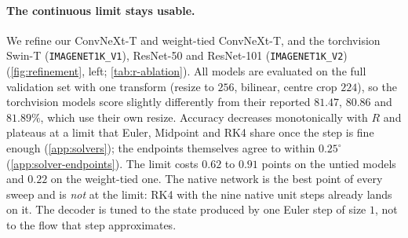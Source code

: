 \begin{table}[t]
    \centering
    \caption{Euler refinement with $\Delta t{=}1/R$ ($T$ kept), ImageNet top-1 (\%).
    For the weight-tied model $R$ means $9R$ applications of the shared block.
    ODE limit: RK4 at $R{=}128$ (tied: $1024$ steps).}
    \label{tab:r-ablation}
    \small
    \setlength{\tabcolsep}{2.8pt}
\end{table}

\paragraph{The continuous limit stays usable.}
We refine our ConvNeXt-T and weight-tied ConvNeXt-T, and the torchvision Swin-T
(\texttt{IMAGENET1K\_V1}), ResNet-50 and ResNet-101 (\texttt{IMAGENET1K\_V2})
(\cref{fig:refinement}, left; \cref{tab:r-ablation}).
All models are evaluated on the full validation set with one transform (resize to $256$,
bilinear, centre crop $224$), so the torchvision models score slightly differently from
their reported $81.47$, $80.86$ and $81.89\%$, which use their own resize.
Accuracy decreases monotonically with $R$ and plateaus at a limit that Euler,
Midpoint and RK4 share once the step is fine enough (\cref{app:solvers}); the
endpoints themselves agree to within $0.25^\circ$ (\cref{app:solver-endpoints}).
The limit costs $0.62$ to $0.91$ points on the untied models and $0.22$ on the
weight-tied one.
The native network is the best point of every sweep and is \emph{not} at the limit:
RK4 with the nine native unit steps already lands on it.
The decoder is tuned to the state produced by one Euler step of size $1$, not to the
flow that step approximates.

